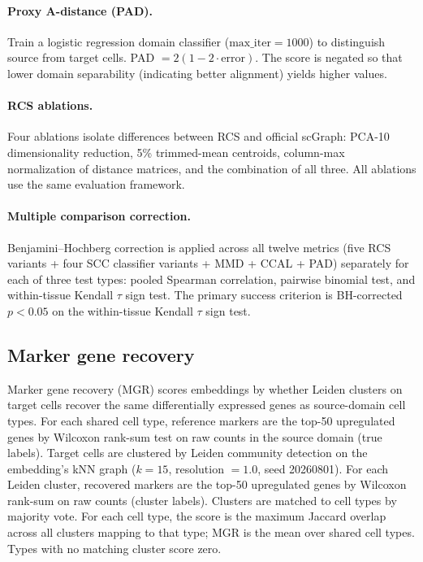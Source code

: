 \documentclass[11pt]{article}
\begin{document}
\paragraph{Proxy A-distance (PAD).} Train a logistic regression domain
classifier ($\text{max\_iter} = 1000$) to distinguish source from target
cells. PAD $= 2(1 - 2 \cdot \text{error})$. The score is negated so
that lower domain separability (indicating better alignment) yields
higher values.

\paragraph{RCS ablations.} Four ablations isolate differences between
RCS and official scGraph: PCA-10 dimensionality reduction, 5\% trimmed-mean
centroids, column-max normalization of distance matrices, and the
combination of all three. All ablations use the same evaluation
framework.

\paragraph{Multiple comparison correction.} Benjamini--Hochberg
correction is applied across all twelve metrics (five RCS variants +
four SCC classifier variants + MMD + CCAL + PAD) separately for each of
three test types: pooled Spearman correlation, pairwise binomial test,
and within-tissue Kendall $\tau$ sign test. The primary success criterion
is BH-corrected $p < 0.05$ on the within-tissue Kendall $\tau$ sign
test.

\subsection{Marker gene recovery}
\label{sec:mgrmethod}

Marker gene recovery (MGR) scores embeddings by whether Leiden
clusters on target cells recover the same differentially expressed
genes as source-domain cell types. For each shared cell type,
reference markers are the top-50 upregulated genes by Wilcoxon
rank-sum test on raw counts in the source domain (true labels). Target
cells are clustered by Leiden community detection on the embedding's
kNN graph ($k = 15$, resolution $= 1.0$, seed 20260801). For each
Leiden cluster, recovered markers are the top-50 upregulated genes by
Wilcoxon rank-sum on raw counts (cluster labels). Clusters are matched
to cell types by majority vote. For each cell type, the score is the
maximum Jaccard overlap across all clusters mapping to that type; MGR
is the mean over shared cell types. Types with no matching cluster
score zero.
\end{document}
